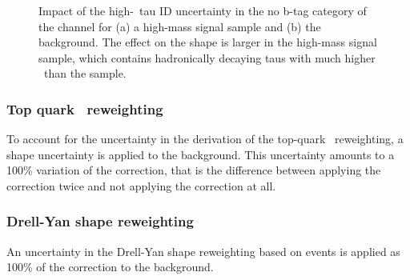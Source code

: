 \begin{figure}[h!]
\begin{center}
\end{center}
\caption[Impact of the high-\pT~tau ID uncertainty in the no b-tag category
of the \tautau channel for a high-mass signal sample and the \Ztautau
background.]{Impact of the high-\pT~tau ID uncertainty in the no b-tag category of the
\tautau channel for (a) a high-mass signal sample and (b) the \Ztautau background. The effect on the shape is
larger in the high-mass signal sample, which contains hadronically decaying taus with much higher
\pT~than the \Ztautau sample.}
\label{fig:mssm_highpttauid_shapes}
\end{figure}
\subsubsection*{Top quark \pT~reweighting}
To account for the uncertainty in the derivation of the top-quark \pT~reweighting, a shape
uncertainty is applied to the \ttbar background. This uncertainty amounts to a 100\% variation
of the correction, that is the difference between applying the correction twice and not applying the correction at all.
\subsubsection*{Drell-Yan shape reweighting}
An uncertainty in the Drell-Yan shape reweighting based on \Zmm events
is applied as 100\% of the correction to the \Ztautau background.
